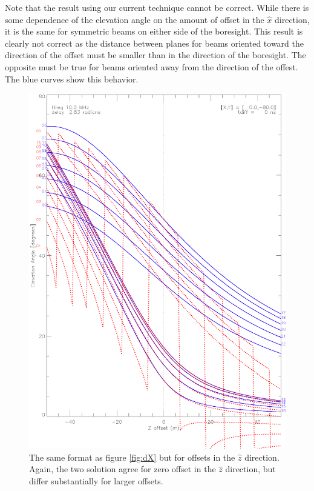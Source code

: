\documentclass{article}
\begin{document}
\noindent
Note that the result using our current technique cannot be correct. While
there is some dependence of the elevation angle on the amount of offset in
the $\hat{x}$ direction, it is the same for symmetric beams on either side
of the boresight. This result is clearly not correct as the distance between
planes for beams oriented toward the direction of the offset must be smaller
than in the direction of the boresight. The opposite must be true for beams
oriented away from the direction of the offest. The blue curves show this
behavior. \\

\begin{figure}[tb]
\includegraphics[scale=.8]{10MHz_Z+.ps}
\caption{The same format as figure \ref{fig:dX} but for offsets in the
$\hat{z}$ direction. Again, the two solution agree for zero offset in the
$\hat{z}$ direction, but differ substantially for larger offsets.}
\label{fig:dZ}
\end{figure}
\end{document}
